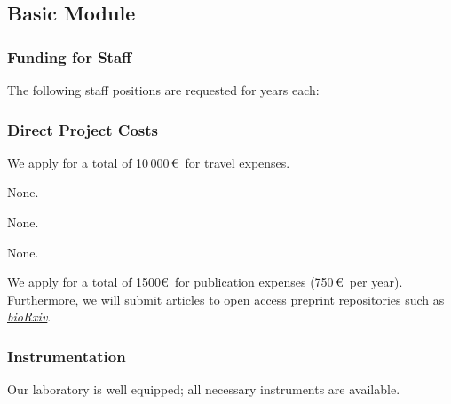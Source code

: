 \subsection{Basic Module}

\subsubsection{Funding for Staff}
\begin{funds}
	The following staff positions are requested for  years each:


\end{funds}


\subsubsection{Direct Project Costs}
\begin{funds}



	We apply for a total of 10\,000\,\euro\ for travel expenses.

	None.

	None.

	None.

	We apply for a total of 1500\euro\ for publication expenses (750\,\euro\ per
	year). Furthermore, we will submit articles to open access preprint repositories
	such as \href{https://www.biorxiv.org/}{\textit{bioRxiv}}.

\end{funds}

\subsubsection{Instrumentation}

Our laboratory is well equipped; all necessary instruments are available.

